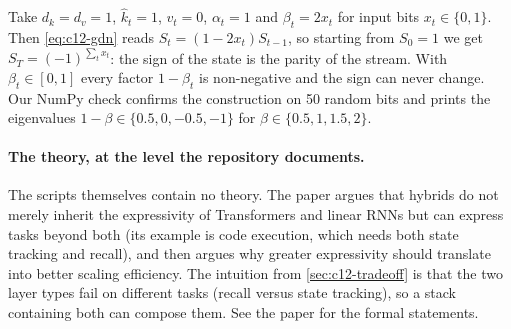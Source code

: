 \begin{example}\label{ex:c12-parity}
Take $d_k = d_v = 1$, $\hat k_t = 1$, $v_t = 0$, $\alpha_t = 1$ and $\beta_t = 2x_t$ for input bits
$x_t\in\{0,1\}$. Then \eqref{eq:c12-gdn} reads $S_t = (1-2x_t)S_{t-1}$, so starting from $S_0 = 1$
we get $S_T = (-1)^{\sum_tx_t}$: the sign of the state is the parity of the stream. With
$\beta_t\in[0,1]$ every factor $1-\beta_t$ is non-negative and the sign can never change. Our
NumPy check confirms the construction on 50 random bits and prints the eigenvalues $1-\beta\in
\{0.5, 0, -0.5, -1\}$ for $\beta\in\{0.5,1,1.5,2\}$.
\end{example}

\paragraph{The theory, at the level the repository documents.} The scripts themselves contain no
theory. The paper argues that hybrids do not merely inherit the expressivity of Transformers and
linear RNNs but can express tasks beyond both (its example is code execution, which needs both
state tracking and recall), and then argues why greater expressivity should translate into better
scaling efficiency. The intuition from \cref{sec:c12-tradeoff} is that the two layer types fail on
different tasks (recall versus state tracking), so a stack containing both can compose them. See
the paper for the formal statements.

